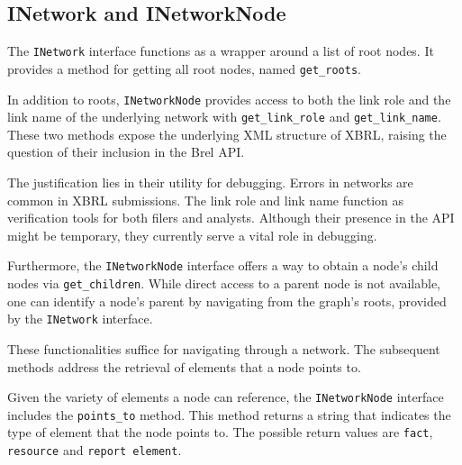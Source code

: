 \subsection{INetwork and INetworkNode}

The \texttt{INetwork} interface functions as a wrapper around a list of root nodes.
It provides a method for getting all root nodes, named \texttt{get\_roots}.

In addition to roots, \texttt{INetworkNode} provides access to both the link role and the link name 
of the underlying network with \texttt{get\_link\_role} and \texttt{get\_link\_name}.
These two methods expose the underlying XML structure of XBRL, raising the question of their inclusion in the Brel API.

The justification lies in their utility for debugging.
Errors in networks are common in XBRL submissions.
The link role and link name function as verification tools for both filers and analysts.
Although their presence in the API might be temporary, they currently serve a vital role in debugging.

Furthermore, the \texttt{INetworkNode} interface offers a way to obtain a node's child nodes via \texttt{get\_children}.
While direct access to a parent node is not available, one can identify a node's parent
by navigating from the graph's roots, provided by the \texttt{INetwork} interface.

These functionalities suffice for navigating through a network.
The subsequent methods address the retrieval of elements that a node points to.

Given the variety of elements a node can reference, the \texttt{INetworkNode} interface includes the \texttt{points\_to} method.
This method returns a string that indicates the type of element that the node points to.
The possible return values are \texttt{fact}, \texttt{resource} and \texttt{report element}.

